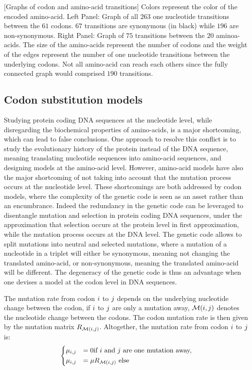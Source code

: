 \begin{center}
\begin{minipage}{0.49\linewidth}
	\end{minipage}
	[Graphs of codon and amino-acid transitions]{
		Colors represent the color of the encoded amino-acid.
		Left Panel: Graph of all $263$ one nucleotide transitions between the $61$ codons. $67$ transitions are synonymous (in black) while $196$ are non-synonymous. 
		Right Panel: Graph of $75$ transitions between the $20$ aminoa-acids. The size of the amino-acids represent the number of codons and the weight of the edges represent the number of one nucleotide transitions between the underlying codons. Not all amino-acid can reach each others since the fully connected graph would comprised $190$ transitions.
	}
\end{center}

\subsection{Codon substitution models}
Studying protein coding \acrshort{DNA} sequences at the nucleotide level, while disregarding the biochemical properties of amino-acids, is a major shortcoming, which can lead to false conclusions.
One approach to resolve this conflict is to study the evolutionary history of the protein instead of the \acrshort{DNA} sequence, meaning translating nucleotide sequences into amino-acid sequences, and designing models at the amino-acid level.
However, amino-acid models have also the major shortcoming of not taking into account that the mutation process occurs at the nucleotide level.
These shortcomings are both addressed by \gls{codon} models, where the complexity of the genetic code is seen as an asset rather than an encumbrance.
Indeed the redundancy in the genetic code can be leveraged to disentangle mutation and selection in protein coding \acrshort{DNA} sequences, under the approximation that selection occurs at the protein level in first approximation, while the mutation process occurs at the \acrshort{DNA} level.
The genetic code allows to split mutations into \gls{neutral} and selected mutations, where a mutation of a nucleotide in a triplet will either be synonymous, meaning not changing the translated amino-acid, or non-synonymous, meaning the translated amino-acid will be different.
The degeneracy of the genetic code is thus an advantage when one devises a model at the \gls{codon} level in \acrshort{DNA} sequences.

The mutation rate from \gls{codon} ${i}$ to ${j}$ depends on the underlying nucleotide change between the \gls{codon}, if ${i}$ to ${j}$ are only a mutation away, $\mathcal{M}({i}, {j})$ denotes the nucleotide change between the codons. The \gls{codon} mutation rate is then given by the mutation matrix ${R_{\mathcal{M}({i}, {j})}}$. Altogether, the mutation rate from \gls{codon} ${i}$ to ${j}$ is:
\begin{equation}
\begin{dcases}
\mu_{{i}, {j}} & = 0 \text{if ${i}$ and ${j}$ are one mutation away,} \\
\mu_{{i}, {j}} & = \mu R_{\mathcal{M}({i}, {j})} \text{ else }
\end{dcases}
\end{equation}


